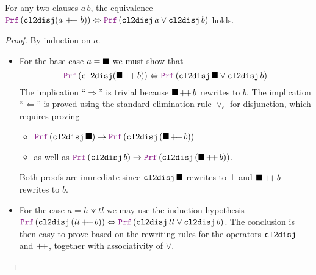\smallskip

\begin{lemma}\label{lemma:clause-equiv-disj}
For any two clauses $a\,b$, the equivalence $\prf\,(\cltodisj(a~\pp~b)) \Leftrightarrow \prf\,(\cltodisj\,a \lor \cltodisj\,b)$ holds.
\end{lemma}
\begin{proof} By induction on $a$.
  \begin{itemize}
    \item For the base case $a = \blacksquare$ we must show that
    \[
        \prf\, (\cltodisj (\nil\, \pp \, b)) \Leftrightarrow \prf\, (\cltodisj\,\nil \lor \cltodisj\,b)
    \]
    The implication ``$\Rightarrow$'' is trivial because $\blacksquare\, {+}\!{+} \,b$ rewrites to $b$.
    The implication ``$\Leftarrow$'' is proved using the standard elimination rule $\lor_e$ for disjunction, which requires proving
    \begin{itemize}
      \item $\prf\,(\cltodisj\,\nil) \ra \prf\,(\cltodisj\,(\nil\,\pp\,b))$
      \item as well as $\prf\,(\cltodisj\,b) \ra \prf\,(\cltodisj\,(\nil\,\pp\,b))$.
    \end{itemize}
    Both proofs are immediate since $\texttt{\upshape{cl2disj}}\,\blacksquare$ rewrites to $\bot$ and $\blacksquare\, {+}\!{+} \,b$ rewrites to $b$.
    \item For the case $a = h \veedot tl$ we may use the induction hypothesis $\prf\,(\cltodisj\, (tl\, \pp\, b)) \Leftrightarrow \prf\,(\cltodisj\,tl \lor \cltodisj\, b)$.
    The conclusion is then easy to prove based on the rewriting rules for the operators $\texttt{\upshape{cl2disj}}$ and $ {+}\!{+} $, together with associativity of $\lor$.
    \end{itemize}
\end{proof}
